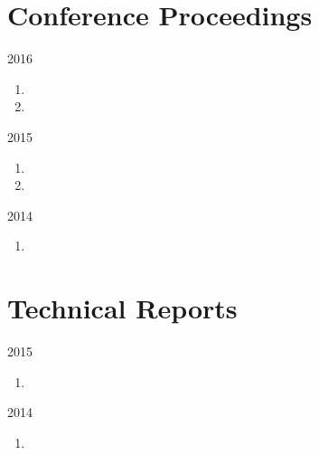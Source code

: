 \section*{Conference Proceedings}

\begin{paracol}{2}
  \textsc{2016}
\switchcolumn
  \begin{enumerate}
    \setcounter{enumi}{\thepubcounter}
    \item {}
    \item {}
    \setcounter{pubcounter}{\theenumi}
  \end{enumerate}
\end{paracol}

\begin{paracol}{2}
  \textsc{2015}
\switchcolumn
  \begin{enumerate}
    \setcounter{enumi}{\thepubcounter}
    \item {}
    \item {}
    \setcounter{pubcounter}{\theenumi}
  \end{enumerate}
\end{paracol}

\begin{paracol}{2}
  \textsc{2014}
\switchcolumn
  \begin{enumerate}
    \setcounter{enumi}{\thepubcounter}
    \item {}
    \setcounter{pubcounter}{\theenumi}
  \end{enumerate}
\end{paracol}

\section*{Technical Reports}

\begin{paracol}{2}
  \textsc{2015}
\switchcolumn
  \begin{enumerate}
    \setcounter{enumi}{\thepubcounter}
    \item {}
    \setcounter{pubcounter}{\theenumi}
  \end{enumerate}
\end{paracol}

\begin{paracol}{2}
  \textsc{2014}
\switchcolumn
  \begin{enumerate}
    \setcounter{enumi}{\thepubcounter}
    \item {}
    \setcounter{pubcounter}{\theenumi}
  \end{enumerate}
\end{paracol}
